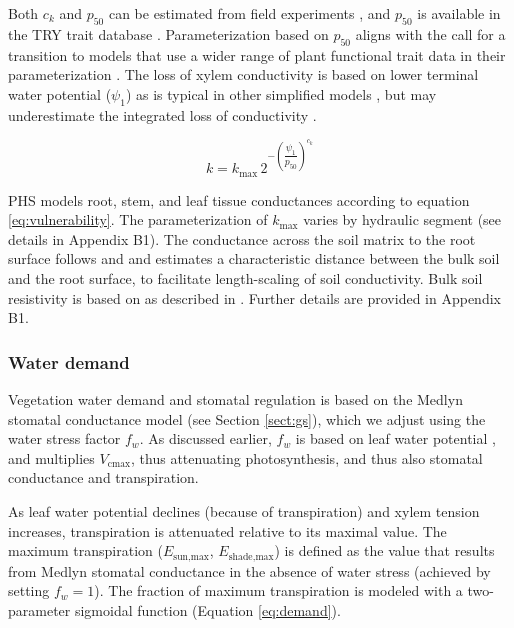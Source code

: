 \documentclass[draft,linenumbers]{agujournal}
\begin{document}
     Both $c_k$ and  $p_{50}$ can be estimated from field experiments \citep{sack2002},  and $p_{50}$ is available in the TRY trait database \citep{kattge2011}. Parameterization based on $p_{50}$ aligns with the call for a transition to models that use a wider range of plant functional trait data in their parameterization \citep{anderegg2015a}. The loss of xylem conductivity is based on lower terminal water potential ($\psi_1$) as is typical in other simplified models \citep{xu2016}, but 
     may underestimate the integrated loss of conductivity \citep{sperry2015}. 
         
     \begin{linenomath*}
     \begin{equation}
     \label{eq:vulnerability}
     k = k_{\text{max}} \, 2^{-\left(\dfrac{\psi_1}{p_{50}}\right)^{c_k}}
     \end{equation}
     \end{linenomath*}
     
     PHS models root, stem, and leaf tissue conductances according to equation \ref{eq:vulnerability}. The parameterization of $k_{\text{max}}$ varies by hydraulic segment (see details in Appendix B1). The conductance across the soil matrix to the root surface follows \citet{williams2001} and \citet{bonan2014} and estimates a characteristic distance between the bulk soil and the root surface, to facilitate length-scaling of soil conductivity. Bulk soil resistivity is based on \citet{clapp1978} as described in \citet{oleson2013}. Further details are provided in Appendix B1.
    
    \subsubsection{Water demand}
    \label{sect:demand}
    
    Vegetation water demand and stomatal regulation is based on the Medlyn stomatal conductance model (see Section \ref{sect:gs}), which we adjust using the water stress factor $f_w$. 
    As discussed earlier, $f_w$ is based on leaf water potential \citep{klein2014}, and multiplies $V_{\text{cmax}}$, thus attenuating photosynthesis, and thus also stomatal conductance and transpiration.
    
     As leaf water potential declines (because of transpiration) and xylem tension increases, transpiration is attenuated relative to its maximal value.  The maximum transpiration ($E_{\text{sun,max}}$, $E_{\text{shade,max}}$) is defined as the value that results from Medlyn stomatal conductance in the absence of water stress (achieved by setting $f_w=1$). The fraction of maximum transpiration is modeled with a two-parameter sigmoidal function (Equation \ref{eq:demand}). 
     
\end{document}
